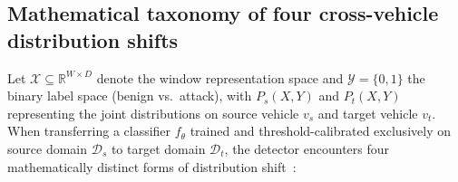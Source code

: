 \documentclass[12pt, a4paper, reqno, oneside]{book}
\begin{document}
\subsection{Mathematical taxonomy of four cross-vehicle distribution shifts}\label{subsec:domain-shifts}
Let $\mathcal{X} \subseteq \mathbb{R}^{W \times D}$ denote the window representation space and $\mathcal{Y} = \{0, 1\}$ the binary label space (benign vs.\ attack), with $P_s(X, Y)$ and $P_t(X, Y)$ representing the joint distributions on source vehicle $v_s$ and target vehicle $v_t$. When transferring a classifier $f_\theta$ trained and threshold-calibrated exclusively on source domain $\mathcal{D}_s$ to target domain $\mathcal{D}_t$, the detector encounters four mathematically distinct forms of distribution shift~\cite{shimodaira2000covariate,quinonerocandela2009dataset,morenotorres2012shift,zhao2019invariant}:
\end{document}
